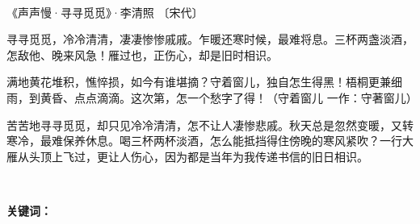 \thispagestyle{plain}    %
\setcounter{page}{1}

\   %


《声声慢·寻寻觅觅》·李清照 〔宋代〕

寻寻觅觅，冷冷清清，凄凄惨惨戚戚。乍暖还寒时候，最难将息。三杯两盏淡酒，怎敌他、晚来风急！雁过也，正伤心，却是旧时相识。

满地黄花堆积，憔悴损，如今有谁堪摘？守着窗儿，独自怎生得黑！梧桐更兼细雨，到黄昏、点点滴滴。这次第，怎一个愁字了得！（守着窗儿 一作：守著窗儿）

苦苦地寻寻觅觅，却只见冷冷清清，怎不让人凄惨悲戚。秋天总是忽然变暖，又转寒冷，最难保养休息。喝三杯两杯淡酒，怎么能抵挡得住傍晚的寒风紧吹？一行大雁从头顶上飞过，更让人伤心，因为都是当年为我传递书信的旧日相识。

\

\noindent
\textbf{\songti 关键词：}
